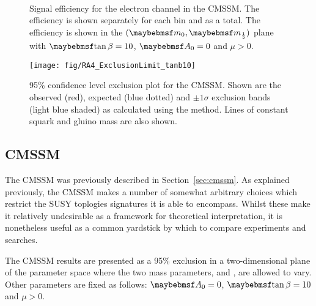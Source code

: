 \begin{figure}[h!]
\centering
{}
\\
\caption[Signal efficiency for the electron channel in the \ac{CMSSM}]{Signal
  efficiency for the electron channel in the \ac{CMSSM}. The efficiency is shown
  separately for each \STlep bin and as a total. The efficiency is shown in the
  $(\Mzero, \Mhalf)$ plane with $\tanbeta=10$, $\Azero=0$ and $\mu > 0$.}
\label{fig:inter_msugra_el}
\end{figure}

\begin{figure}[h!]
\texttt{[image: fig/RA4\_ExclusionLimit\_tanb10]}
\caption[95\% confidence level exclusion plot for the \ac{CMSSM}]{95\% confidence level exclusion plot for the
  \ac{CMSSM}. Shown are the observed (red), expected (blue dotted) and $\pm
  1\sigma$ exclusion bands (light blue shaded) as calculated using the \CLs
  method. Lines of constant squark and gluino mass are also shown.}
\label{fig:inter_msugra_exclusion}
\end{figure}

\subsection{\ac{CMSSM}}
The \ac{CMSSM} was previously described in Section~\ref{sec:cmssm}. As explained
previously, the \ac{CMSSM} makes a number of somewhat arbitrary choices which
restrict the \ac{SUSY} toplogies signatures it is able to encompass. Whilst
these make it relatively undesirable as a framework for theoretical
interpretation, it is nonetheless useful as a common yardstick by which to
compare experiments and searches.

The \ac{CMSSM} results are presented as a 95\% exclusion in a two-dimensional
plane of the parameter space where the two mass parameters, \Mzero and \Mhalf,
are allowed to vary. Other parameters are fixed as follows: $\Azero = 0$,
$\tanbeta = 10$ and $\mu > 0$.

